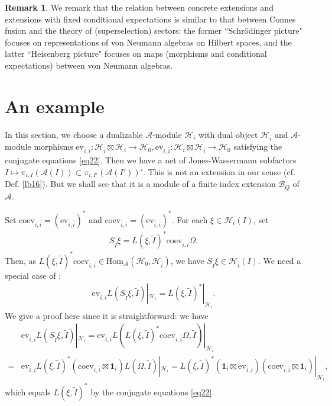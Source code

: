 \documentclass[11pt,b5paper,notitlepage]{article}
\theoremstyle{definition}
\newtheorem{rem}[df]{Remark}
\theoremstyle{plain}
\newcommand{\mc}{\mathcal}
\newcommand{\wtd}{\widetilde}
\newcommand{\ovl}{\overline}
\newcommand{\id}{\mathbf{1}}
\newcommand{\Hom}{\mathrm{Hom}}
\newcommand{\ev}{\mathrm{ev}}
\newcommand{\coev}{\mathrm{coev}}
\numberwithin{equation}{section}
\begin{document}
\begin{rem}
We remark that the relation between  concrete extensions and  extensions with fixed conditional expectations is similar to that between Connes fusion and the theory of (superselection) sectors: the former ``Schr\"odinger picture" focuses  on  representations of von Neumann algebras on Hilbert spaces, and the latter ``Heisenberg picture" focuses on maps (morphisms and conditional expectations) between von Neumann algebras.
\end{rem}



\section{An example}


In this section, we choose a dualizable $\mc A$-module $\mc H_i$ with dual object $\mc H_{\ovl i}$ and $\mc A$-module morphisms $\ev_{\ovl i,i}:\mc H_{\ovl i}\boxtimes\mc H_i\rightarrow\mc H_0,\ev_{i,\ovl i}:\mc H_i\boxtimes\mc H_{\ovl i}\rightarrow\mc H_0$ satisfying the conjugate equations \eqref{eq22}. Then we have a net of Jones-Wassermann subfactors $I\mapsto \pi_{i,I}(\mc A(I))\subset \pi_{i,I'}(\mc A(I'))'$. This is not an extension in our sense (cf. Def. \ref{lb16}). But we shall see that it is a module of a finite index extension $\mc B_Q$ of $\mc A$.

Set $\coev_{i,\ovl i}=(\ev_{i,\ovl i})^*$ and $\coev_{\ovl i,i}=(\ev_{\ovl i,i})^*$. For each $\xi\in\mc H_i(I)$, set
\begin{align*}
S_{\wtd I}\xi=L(\xi,\wtd I)^*\coev_{i,\ovl i}\Omega.
\end{align*}
Then, as $L(\xi,\wtd I)^*\coev_{i,\ovl i}\in\Hom_{\mc A}(\mc H_0,\mc H_{\ovl i})$, we have $S_{\wtd I}\xi\in\mc H_{\ovl i}(I)$. We need a special case of \cite[Cor. 5.6]{Gui21b}:
\begin{align}
\ev_{\ovl i,i}L(S_{\wtd I}\xi,\wtd I)|_{\mc H_i}=L(\xi,\wtd I)^*|_{\mc H_i}.	\label{eq23}
\end{align}
We give a proof here since it is straightforward: we have
\begin{align*}
&\ev_{\ovl i,i}L(S_{\wtd I}\xi,\wtd I)|_{\mc H_i}=\ev_{\ovl i,i}L(L(\xi,\wtd I)^*\coev_{i,\ovl i}\Omega,\wtd I)|_{\mc H_i}\\	
=&\ev_{\ovl i,i}L(\xi,\wtd I)^*(\coev_{i,\ovl i}\boxtimes\id_i)L(\Omega,\wtd I)|_{\mc H_i}=L(\xi,\wtd I)^*(\id_i\boxtimes\ev_{\ovl i,i})(\coev_{i,\ovl i}\boxtimes\id_i)|_{\mc H_i},
\end{align*}
which equals $L(\xi,\wtd I)^*$ by the conjugate equations \eqref{eq22}. 
\end{document}
